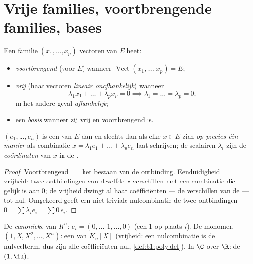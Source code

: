 \section{Vrije families, voortbrengende families, bases}

\begin{definition}\label{def:b1:vspaces:free}
Een familie $(x_1, \dots, x_p)$ vectoren van $E$ heet:
\begin{itemize}
  \item \emph{voortbrengend} (voor $E$) wanneer
        $\operatorname{Vect}(x_1,\dots,x_p) = E$;
  \item \emph{vrij} (haar vectoren
        \emph{lineair onafhankelijk}) wanneer
        \[
        \lambda_1 x_1 + \dots + \lambda_p x_p = 0
        \implies \lambda_1 = \dots = \lambda_p = 0 ;
        \]
        in het andere geval \emph{afhankelijk};
  \item een \emph{basis} wanneer zij vrij en
        voortbrengend is.
\end{itemize}
\end{definition}

\begin{proposition}[Coördinaten]\label{prop:b1:vspaces:coordinates}
$(e_1, \dots, e_n)$ is een  van $E$ dan en slechts dan als elke
$x \in E$ zich \emph{op precies één manier} als combinatie $x =
\lambda_1 e_1 + \dots + \lambda_n e_n$ laat schrijven; de scalairen
$\lambda_i$ zijn de \emph{coördinaten} van $x$ in
de .
\end{proposition}

\begin{proof}
Voortbrengend $=$ het bestaan van de ontbinding. Eenduidigheid $=$
vrijheid: twee ontbindingen van dezelfde $x$ verschillen met een
combinatie die gelijk is aan $0$; de vrijheid dwingt al haar
coëfficiënten --- de verschillen van de  --- tot nul.
Omgekeerd geeft een niet-triviale nulcombinatie de twee
ontbindingen $0 = \sum \lambda_i e_i = \sum 0\,e_i$.
\end{proof}

\begin{example}\label{ex:b1:vspaces:bases}
De \emph{canonieke } van $K^n$: $e_i = (0, \dots, 1, \dots,
0)$ (een $1$ op plaats $i$). De monomen $(1, X, X^2, \dots, X^n)$:
een  van $K_n[X]$ (vrijheid: een nulcombinatie is de
nulveelterm, dus zijn alle coëfficiënten nul,
\cref{def:b1:poly:def}). In $\C$ over $\R$: de  $(1, \iu)$.
\end{example}

